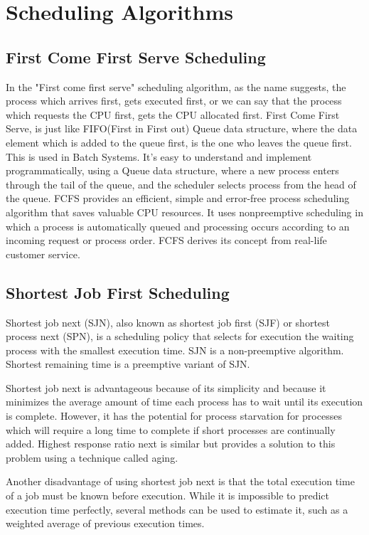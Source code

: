 \documentclass[11pt,a4paper]{report}
\begin{document}
\section{Scheduling Algorithms}
\subsection*{First Come First Serve Scheduling}
\hspace*{\parindent}In the "First come first serve" scheduling algorithm, as the name suggests, the process which arrives first, gets executed first, or we can say that the process which requests the CPU first, gets the CPU allocated first. First Come First Serve, is just like FIFO(First in First out) Queue data structure, where the data element which is added to the queue first, is the one who leaves the queue first. This is used in Batch Systems. It's easy to understand and implement programmatically, using a Queue data structure, where a new process enters through the tail of the queue, and the scheduler selects process from the head of the queue. FCFS provides an efficient, simple and error-free process scheduling algorithm that saves valuable CPU resources. It uses nonpreemptive scheduling in which a process is automatically queued and processing occurs according to an incoming request or process order. FCFS derives its concept from real-life customer service.

\subsection*{Shortest Job First Scheduling}
\hspace*{\parindent}Shortest job next (SJN), also known as shortest job first (SJF) or shortest process next (SPN), is a scheduling policy that selects for execution the waiting process with the smallest execution time. SJN is a non-preemptive algorithm. Shortest remaining time is a preemptive variant of SJN.

Shortest job next is advantageous because of its simplicity and because it minimizes the average amount of time each process has to wait until its execution is complete. However, it has the potential for process starvation for processes which will require a long time to complete if short processes are continually added. Highest response ratio next is similar but provides a solution to this problem using a technique called aging.

Another disadvantage of using shortest job next is that the total execution time of a job must be known before execution. While it is impossible to predict execution time perfectly, several methods can be used to estimate it, such as a weighted average of previous execution times.
\end{document}
